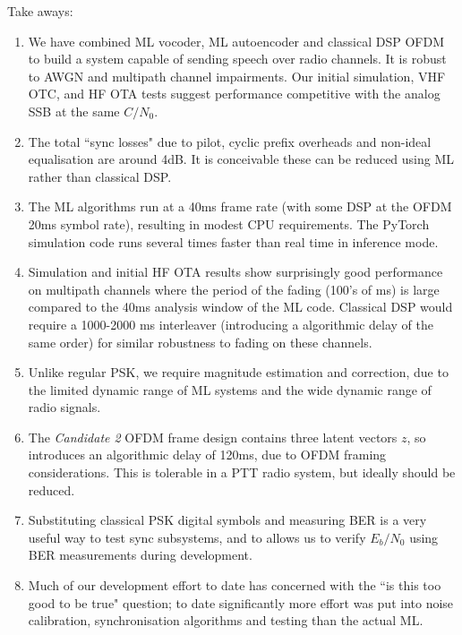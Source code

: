 \documentclass{article}
\begin{document}
Take aways:
\begin{enumerate}
\item We have combined ML vocoder, ML autoencoder and classical DSP OFDM to build a system capable of sending speech over radio channels.  It is robust to AWGN and multipath channel impairments.  Our initial simulation, VHF OTC, and HF OTA tests suggest performance competitive with the analog SSB at the same $C/N_0$.
\item The total ``sync losses" due to pilot, cyclic prefix overheads and non-ideal equalisation are around 4dB.  It is conceivable these can be reduced using ML rather than classical DSP. 
\item The ML algorithms run at a 40ms frame rate (with some DSP at the OFDM 20ms symbol rate), resulting in modest CPU requirements.  The PyTorch simulation code runs several times faster than real time in inference mode.
\item Simulation and initial HF OTA results show surprisingly good performance on multipath channels where the period of the fading (100's of ms) is large compared to the 40ms analysis window of the ML code.  Classical DSP would require a 1000-2000 ms interleaver (introducing a algorithmic delay of the same order) for similar robustness to fading on these channels.
\item Unlike regular PSK, we require magnitude estimation and correction, due to the limited dynamic range of ML systems and the wide dynamic range of radio signals.
\item The \emph{Candidate 2} OFDM frame design \cite{FreeDV-032} contains three latent vectors $z$, so introduces an algorithmic delay of 120ms, due to OFDM framing considerations.  This is tolerable in a PTT radio system, but ideally should be reduced.
\item Substituting classical PSK digital symbols and measuring BER is a very useful way to test sync subsystems, and to allows us to verify $E_b/N_0$ using BER measurements during development.
\item Much of our development effort to date has concerned with the ``is this too good to be true" question; to date significantly more effort was put into noise calibration, synchronisation algorithms and testing than the actual ML.
\end{enumerate}
\end{document}
